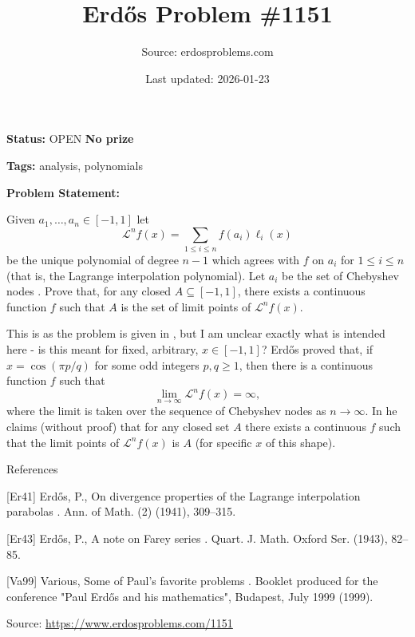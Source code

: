 \documentclass{article}
\title{Erd\H{o}s Problem \#1151}
\date{Last updated: 2026-01-23}
\author{Source: erdosproblems.com}
\begin{document}
\maketitle

\noindent\textbf{Status:} OPEN \quad \textbf{No prize}

\noindent\textbf{Tags:} analysis, polynomials

\medskip

\noindent\textbf{Problem Statement:}

Given $a_1,\ldots,a_n\in [-1,1]$ let\[\mathcal{L}^nf(x) = \sum_{1\leq i\leq n}f(a_i)\ell_i(x)\]be the unique polynomial of degree $n-1$ which agrees with $f$ on $a_i$ for $1\leq i\leq n$ (that is, the Lagrange interpolation polynomial). Let $a_i$ be the set of Chebyshev nodes . Prove that, for any closed $A\subseteq [-1,1]$, there exists a continuous function $f$ such that $A$ is the set of limit points of $\mathcal{L}^nf(x)$.




This is as the problem is given in \cite{Va99}, but I am unclear exactly what is intended here - is this meant for fixed, arbitrary, $x\in [-1,1]$? Erd\H{o}s \cite{Er41} proved that, if $x=\cos(\pi p/q)$ for some odd integers $p,q\geq 1$, then there is a continuous function $f$ such that\[\lim_{n\to \infty}\mathcal{L}^nf(x)=\infty,\]where the limit is taken over the sequence of Chebyshev nodes as $n\to \infty$. In \cite{Er43} he claims (without proof) that for any closed set $A$ there exists a continuous $f$ such that the limit points of $\mathcal{L}^nf(x)$ is $A$ (for specific $x$ of this shape).




References

[Er41] Erd\H{o}s, P., On divergence properties of the {L}agrange interpolation parabolas . Ann. of Math. (2) (1941), 309--315.

[Er43] Erd\H{o}s, P., A note on {F}arey series . Quart. J. Math. Oxford Ser. (1943), 82--85.

[Va99] Various, Some of Paul's favorite problems . Booklet produced for the conference "Paul Erd\H{o}s and his mathematics", Budapest, July 1999 (1999).


\bigskip
\noindent\small{Source: \url{https://www.erdosproblems.com/1151}}
\end{document}
